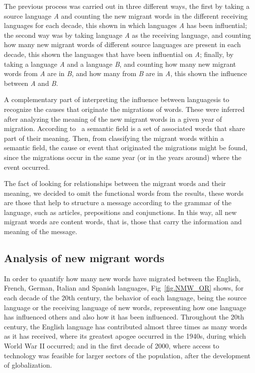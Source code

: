 \documentclass[10pt,letterpaper]{article} %
\begin{document}
The previous process was carried out in three different ways, the first by taking a source language \textit{A} and counting the new migrant words in the different receiving languages ​​for each decade, this shown in which languages \textit{A}​ has been influential; the second way was by taking language \textit{A} as the receiving language, and counting how many new migrant words of different source languages are present in each decade, this shown the languages that have been influential on \textit{A}; finally, by taking a language \textit{A} and a language \textit{B}, and counting how many new migrant words from \textit{A} are in \textit{B}, and how many from \textit{B} are in \textit{A}, this shown the influence between \textit{A} and \textit{B}.

A complementary part of interpreting the influence between languages ​​is to recognize the causes that originate the migrations of words. These were inferred after analyzing the meaning of the new migrant words in a given year of migration. According to~\cite{semantic} a semantic field is a set of associated words that share part of their meaning. Then, from classifying the migrant words within a semantic field, the cause or event that originated the migrations might be found, since the migrations occur in the same year (or in the years around) where the event occurred.

The fact of looking for relationships between the migrant words and their meaning, we decided to omit the functional words from the results, these words are those that help to structure a message according to the grammar of the language, such as articles, prepositions and conjunctions. In this way, all new migrant words are content words, that is, those that carry the information and meaning of the message.
\subsection*{Analysis of new migrant words} %

In order to quantify how many new words have migrated between the English, French, German, Italian and Spanish languages, Fig~\ref{fig.NMW_OR} shows, for each decade of the 20th century, the behavior of each language, being the source language or the receiving language of new words, representing how one language has influenced others and also how it has been influenced. Throughout the 20th century, the English language has contributed almost three times as many words as it has received, where its greatest apogee occurred in the  1940s, during which World War II occurred; and in the first decade of 2000, where access to technology was feasible for larger sectors of the population, after the development of globalization.
\end{document}
